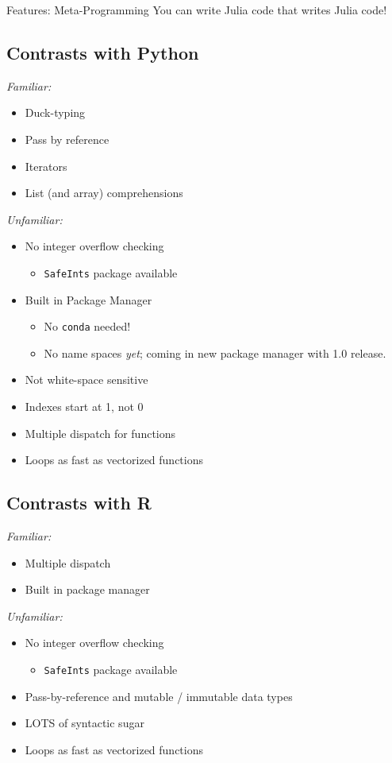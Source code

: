 \documentclass[11pt]{beamer}
\begin{document}
\begin{frame}[c]{Features: Meta-Programming}
You can write Julia code that writes Julia code!
\end{frame}



\subsection*{Contrasts with Python}
\emph{Familiar:}
\begin{itemize}
    \item Duck-typing
    \item Pass by reference
    \item Iterators
    \item List (and array) comprehensions
\end{itemize}
\emph{Unfamiliar:}
\begin{itemize}
    \item No integer overflow checking
    \begin{itemize}
        \item \texttt{SafeInts} package available
    \end{itemize}
    \item Built in Package Manager
    \begin{itemize}
        \item No \texttt{conda} needed!
        \item No name spaces \emph{yet}; coming in new package manager with 1.0 release.
    \end{itemize}
    \item Not white-space sensitive
    \item Indexes start at 1, not 0
    \item Multiple dispatch for functions
    \item Loops as fast as vectorized functions
\end{itemize}

\subsection*{Contrasts with R}
\emph{Familiar:}
\begin{itemize}
    \item Multiple dispatch
    \item Built in package manager
\end{itemize}
\emph{Unfamiliar:}
\begin{itemize}
    \item No integer overflow checking
    \begin{itemize}
        \item \texttt{SafeInts} package available
    \end{itemize}
    \item Pass-by-reference and mutable / immutable data types
    \item LOTS of syntactic sugar
    \item Loops as fast as vectorized functions
\end{itemize}
\end{document}
